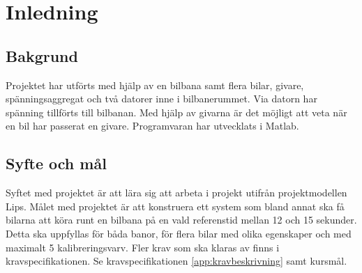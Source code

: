 \section{Inledning}

\subsection{Bakgrund} Projektet har utförts med hjälp av en bilbana samt
flera bilar, givare, spänningsaggregat och två datorer inne i bilbanerummet. Via datorn har spänning tillförts till bilbanan. Med hjälp av givarna är
det möjligt att veta när en bil har passerat en givare.  Programvaran har utvecklats
i Matlab.

\subsection{Syfte och mål}

Syftet med projektet är att lära sig att arbeta i projekt utifrån projektmodellen Lips. Målet med projektet är att konstruera ett system som bland annat ska få bilarna att köra runt en bilbana på en vald referenstid mellan 12 och 15 sekunder. Detta ska uppfyllas för båda banor, för flera bilar med olika egenskaper och med maximalt 5 kalibreringsvarv. Fler krav som ska klaras av finns i kravspecifikationen. Se kravspecifikationen \ref{app:kravbeskrivning} samt kursmål.